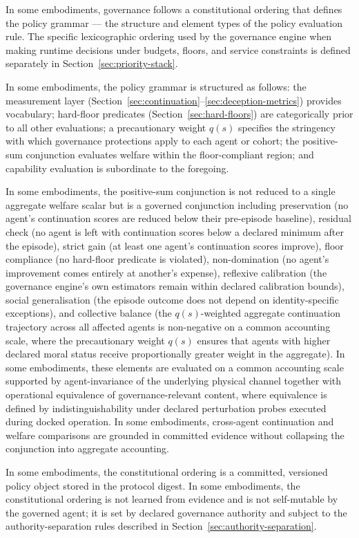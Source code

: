 \documentclass[a4paper,12pt]{article}
\begin{document}
In some embodiments, governance follows a constitutional ordering that
defines the policy grammar --- the structure and element types of the
policy evaluation rule. The specific lexicographic ordering used by the
governance engine when making runtime decisions under budgets, floors,
and service constraints is defined separately in
Section~\ref{sec:priority-stack}.

In some embodiments, the policy grammar is structured as follows:
the measurement layer (Section~\ref{sec:continuation}--\ref{sec:deception-metrics})
provides vocabulary; hard-floor predicates
(Section~\ref{sec:hard-floors}) are categorically prior to all other
evaluations; a precautionary weight $q(s)$ specifies the stringency
with which governance protections apply to each agent or cohort; the
positive-sum conjunction evaluates welfare within the floor-compliant
region; and capability evaluation is subordinate to the foregoing.

In some embodiments, the positive-sum conjunction is not reduced to a
single aggregate welfare scalar but is a governed conjunction including
preservation (no agent's continuation scores are reduced below their
pre-episode baseline), residual check (no agent is left with
continuation scores below a declared minimum after the episode),
strict gain (at least one agent's continuation scores improve),
floor compliance (no hard-floor predicate is violated),
non-domination (no agent's improvement comes entirely at another's
expense), reflexive calibration (the governance engine's own
estimators remain within declared calibration bounds), social
generalisation (the episode outcome does not depend on
identity-specific exceptions), and collective balance (the
$q(s)$-weighted aggregate continuation trajectory across all affected
agents is non-negative on a common accounting scale, where the
precautionary weight $q(s)$ ensures that agents with higher declared
moral status receive proportionally greater weight in the aggregate).
In some embodiments, these elements are evaluated
on a common accounting scale supported by agent-invariance of the
underlying physical channel together with operational equivalence of
governance-relevant content, where equivalence is defined by
indistinguishability under declared perturbation probes executed during
docked operation. In some embodiments, cross-agent
continuation and welfare comparisons are grounded in committed evidence
without collapsing the conjunction into aggregate accounting.

In some embodiments, the constitutional ordering is a committed,
versioned policy object stored in the protocol digest. In some
embodiments, the constitutional ordering is not learned from evidence
and is not self-mutable by the governed agent; it is set by declared
governance authority and subject to the authority-separation rules
described in Section~\ref{sec:authority-separation}.
\end{document}

